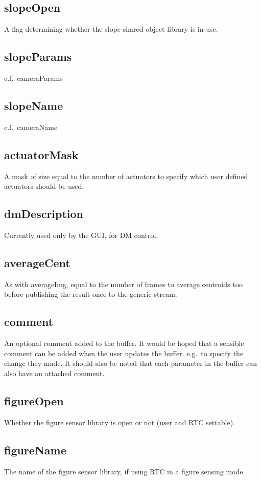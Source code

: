 \documentclass[a4,10pt]{article}
\begin{document}
\subsection{slopeOpen}
A flag determining whether the slope
shared object library is in use.

\subsection{slopeParams}
c.f.\ cameraParams

\subsection{slopeName}
c.f.\ cameraName

\subsection{actuatorMask}
A mask of size equal to the number of actuators to specify which user
defined actuators should be used.

\subsection{dmDescription}
Currently used only by the GUI, for DM control.

\subsection{averageCent}
As with averageImg, equal to the number of frames to average centroids
too before publishing the result once to the generic stream.


\subsection{comment}
An optional comment added to the buffer.  It would be hoped that
a sensible comment can be added when the user updates the buffer.
e.g.\ to specify the change they made.  It should also be noted that
each parameter in the buffer can also have an attached comment.



\subsection{figureOpen}
Whether the figure sensor library is open or not (user and RTC
settable).

\subsection{figureName}
The name of the figure sensor library, if using RTC in a figure
sensing mode.
\end{document}
